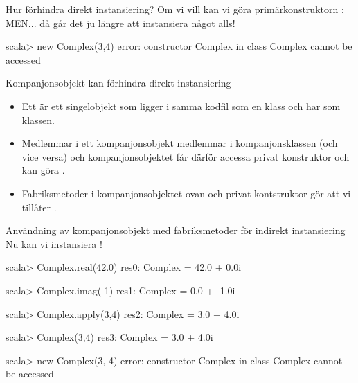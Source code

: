 \begin{Slide}{Hur förhindra direkt instansiering?}
Om vi vill  kan vi göra primärkonstruktorn :
MEN... då går det ju  längre att instansiera något alls!  \code{   :(}
\begin{REPLnonum}
scala> new Complex(3,4)
error:
 constructor Complex in class Complex cannot be accessed
\end{REPLnonum}
\end{Slide}



\begin{Slide}{Kompanjonsobjekt kan förhindra direkt instansiering}\SlideFontSmall
\setlength{\leftmargini}{0pt}
\begin{itemize}
\item Ett   är ett singelobjekt som ligger i samma kodfil som en klass och har  som klassen.

\item Medlemmar i ett kompanjonsobjekt  medlemmar i kompanjonsklassen (och vice versa) och kompanjonsobjektet får därför accessa privat konstruktor och kan göra .

\item Fabriksmetoder i kompanjonsobjektet ovan och privat kontstruktor gör att vi  tillåter .
\end{itemize}
\end{Slide}

\begin{Slide}{Användning av kompanjonsobjekt med fabriksmetoder för indirekt instansiering}
Nu kan vi  instansiera !  \code{   :)}
\begin{REPLnonum}
scala> Complex.real(42.0)
res0: Complex = 42.0 + 0.0i

scala> Complex.imag(-1)
res1: Complex = 0.0 + -1.0i

scala> Complex.apply(3,4)
res2: Complex = 3.0 + 4.0i

scala> Complex(3,4)
res3: Complex = 3.0 + 4.0i

scala> new Complex(3, 4)
error:
     constructor Complex in class Complex cannot be accessed
\end{REPLnonum}
\end{Slide}


